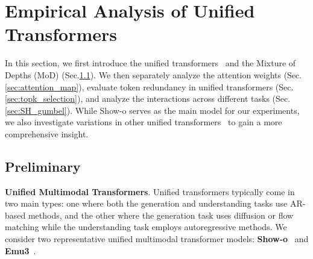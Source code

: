 


\section{Empirical Analysis of Unified Transformers}
In this section, we first introduce the unified transformers~\cite{showo,emu3} and the Mixture of Depths (MoD)\cite{mod} (Sec.\ref{sec:preliminary}). We then separately analyze the attention weights (Sec.\ref{sec:attention_map}), evaluate token redundancy in unified transformers (Sec.\ref{sec:topk_selection}), and analyze the interactions across different tasks (Sec.\ref{sec:SH_gumbel}). While Show-o serves as the main model for our experiments, we also investigate variations in other unified transformers~\cite{janusflow,luminamgpt,emu3} to gain a more comprehensive insight.



\subsection{Preliminary}
\label{sec:preliminary}




\textbf{Unified Multimodal Transformers}. Unified transformers typically come in two main types: one where both the generation and understanding tasks use AR-based methods, and the other where the generation task uses diffusion or flow matching while the understanding task employs autoregressive methods. We consider two representative unified multimodal transformer models: \textbf{Show-o}~\cite{showo} and \textbf{Emu3}~\cite{emu3}.

